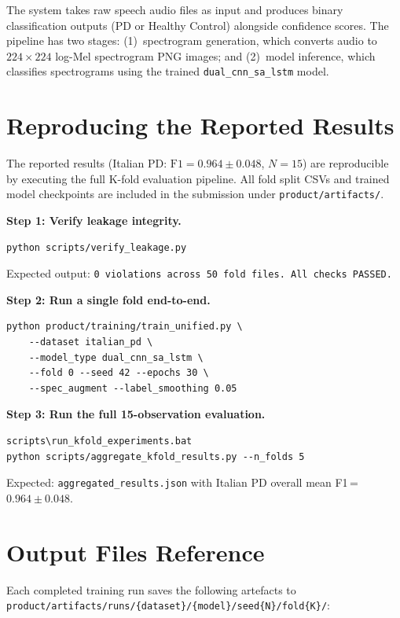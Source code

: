 \documentclass[oneside,openany]{final_report}
\newcommand{\dualcnn}{\texttt{dual\_cnn\_sa\_lstm}}
\begin{document}
The system takes raw speech audio files as input and produces binary classification outputs (PD or Healthy Control) alongside confidence scores. The pipeline has two stages: (1)~spectrogram generation, which converts audio to $224 \times 224$ log-Mel spectrogram PNG images; and (2)~model inference, which classifies spectrograms using the trained \dualcnn{} model.

\section{Reproducing the Reported Results}

The reported results (Italian PD: $\text{F1} = 0.964 \pm 0.048$, $N\!=\!15$) are reproducible by executing the full K-fold evaluation pipeline. All fold split CSVs and trained model checkpoints are included in the submission under \texttt{product/artifacts/}.

\textbf{Step 1: Verify leakage integrity.}
\begin{verbatim}
python scripts/verify_leakage.py
\end{verbatim}
Expected output: \texttt{0 violations across 50 fold files. All checks PASSED.}

\textbf{Step 2: Run a single fold end-to-end.}
\begin{verbatim}
python product/training/train_unified.py \
    --dataset italian_pd \
    --model_type dual_cnn_sa_lstm \
    --fold 0 --seed 42 --epochs 30 \
    --spec_augment --label_smoothing 0.05
\end{verbatim}

\textbf{Step 3: Run the full 15-observation evaluation.}
\begin{verbatim}
scripts\run_kfold_experiments.bat
python scripts/aggregate_kfold_results.py --n_folds 5
\end{verbatim}
Expected: \texttt{aggregated\_results.json} with Italian PD overall mean F1\,=\,$0.964 \pm 0.048$.

\section{Output Files Reference}

Each completed training run saves the following artefacts to \texttt{product/artifacts/runs/\{dataset\}/\{model\}/seed\{N\}/fold\{K\}/}:
\end{document}
